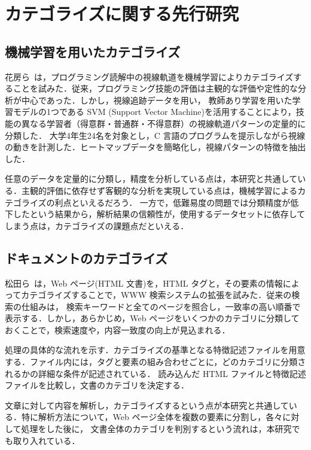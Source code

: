 \section{カテゴライズに関する先行研究}
\label{sec:categolize}

\subsection{機械学習を用いたカテゴライズ}
\label{subec:cate_study}

花房ら~\cite{hanabusa2015}は，プログラミング読解中の視線軌道を機械学習によりカテゴライズすることを試みた．従来，プログラミング技能の評価は主観的な評価や定性的な分析が中心であった．しかし，視線追跡データを用い，
教師あり学習を用いた学習モデルの1つである SVM (Support Vector Machine)を活用することにより，技能の異なる学習者（得意群・普通群・不得意群）の視線軌道パターンの定量的に分類した．
大学4年生24名を対象とし，C 言語のプログラムを提示しながら視線の動きを計測した．ヒートマップデータを簡略化し，視線パターンの特徴を抽出した．

任意のデータを定量的に分類し，精度を分析している点は，本研究と共通している．主観的評価に依存せず客観的な分析を実現している点は，機械学習によるカテゴライズの利点といえるだろう．
一方で，低難易度の問題では分類精度が低下したという結果から，解析結果の信頼性が，使用するデータセットに依存してしまう点は，カテゴライズの課題点だといえる．

\subsection{ドキュメントのカテゴライズ}
\label{subsec:cate_doc}

松田ら~\cite{matsuda1999}は，Web ページ(HTML 文書)を，HTML タグと，その要素の情報によってカテゴライズすることで，WWW 検索システムの拡張を試みた．従来の検索の仕組みは，
検索キーワードと全てのページを照合し，一致率の高い順番で表示する．しかし，あらかじめ，Web ページをいくつかのカテゴリに分類しておくことで，検索速度や，内容一致度の向上が見込まれる．

処理の具体的な流れを示す．カテゴライズの基準となる特徴記述ファイルを用意する．ファイル内には，タグと要素の組み合わせごとに，どのカテゴリに分類されるかの詳細な条件が記述されている．
読み込んだ HTML ファイルと特徴記述ファイルを比較し，文書のカテゴリを決定する．

文章に対して内容を解析し，カテゴライズするという点が本研究と共通している．特に解析方法について，Web ページ全体を複数の要素に分割し，各々に対して処理をした後に，
文書全体のカテゴリを判別するという流れは，本研究でも取り入れている．

